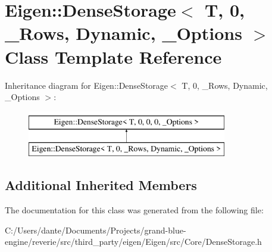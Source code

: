 \hypertarget{class_eigen_1_1_dense_storage_3_01_t_00_010_00_01___rows_00_01_dynamic_00_01___options_01_4}{}\section{Eigen\+::Dense\+Storage$<$ T, 0, \+\_\+\+Rows, Dynamic, \+\_\+\+Options $>$ Class Template Reference}
\label{class_eigen_1_1_dense_storage_3_01_t_00_010_00_01___rows_00_01_dynamic_00_01___options_01_4}
Inheritance diagram for Eigen\+::Dense\+Storage$<$ T, 0, \+\_\+\+Rows, Dynamic, \+\_\+\+Options $>$\+:\begin{figure}[H]
\begin{center}
\leavevmode
\includegraphics[height=2.000000cm]{class_eigen_1_1_dense_storage_3_01_t_00_010_00_01___rows_00_01_dynamic_00_01___options_01_4}
\end{center}
\end{figure}
\subsection*{Additional Inherited Members}


The documentation for this class was generated from the following file\+:\begin{DoxyCompactItemize}
\item 
C\+:/\+Users/dante/\+Documents/\+Projects/grand-\/blue-\/engine/reverie/src/third\+\_\+party/eigen/\+Eigen/src/\+Core/Dense\+Storage.\+h\end{DoxyCompactItemize}
